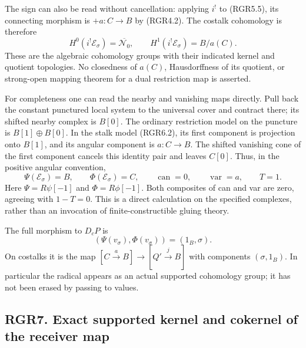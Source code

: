 The sign can also be read without cancellation: applying \(i^!\) to
(RGR5.5), its connecting morphism is \(+a:C\to B\) by (RGR4.2). The
costalk cohomology is therefore \[
 H^0(i^!\mathscr E_\sigma)=\overline{\mathcal N_0},\qquad
 H^1(i^!\mathscr E_\sigma)=B/a(C).
 \tag{RGR6.4}
\] These are the algebraic cohomology groups with their indicated kernel
and quotient topologies. No closedness of \(a(C)\), Hausdorffness of its
quotient, or strong-open mapping theorem for a dual restriction map is
asserted.

For completeness one can read the nearby and vanishing maps directly.
Pull back the constant punctured local system to the universal cover and
contract there; its shifted nearby complex is \(B[0]\). The ordinary
restriction model on the puncture is \(B[1]\oplus B[0]\). In the stalk
model (RGR6.2), its first component is projection onto \(B[1]\), and its
angular component is \(a:C\to B\). The shifted vanishing cone of the
first component cancels this identity pair and leaves \(C[0]\). Thus, in
the positive angular convention, \[
 \Psi(\mathscr E_\sigma)=B,\qquad
 \Phi(\mathscr E_\sigma)=C,\qquad
 \operatorname{can}=0,\qquad
 \operatorname{var}=a,\qquad T=1.
 \tag{RGR6.5}
\] Here \(\Psi=R\psi[-1]\) and \(\Phi=R\phi[-1]\). Both composites of
can and var are zero, agreeing with \(1-T=0\). This is a direct
calculation on the specified complexes, rather than an invocation of
finite-constructible gluing theory.

The full morphism to \(D_cP\) is \[
 (\Psi(v_\sigma),\Phi(v_\sigma))=(1_B,\sigma).
 \tag{RGR6.6}
\] On costalks it is the map
\([C\xrightarrow a B]\to[Q'\xrightarrow j B]\) with components
\((\sigma,1_B)\). In particular the radical appears as an actual
supported cohomology group; it has not been erased by passing to values.

\subsection{RGR7. Exact supported kernel and cokernel of the receiver
map}\label{rgr7.-exact-supported-kernel-and-cokernel-of-the-receiver-map}

